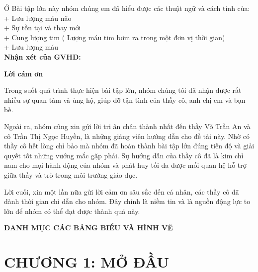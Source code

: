 \documentclass[12pt,a4paper]{article}
\begin{document}
Ở Bài tập lớn này nhóm chúng em đã hiểu được các thuật ngữ và cách tính của:\\
+ Lưu lượng máu não\\
+ Sự tồn tại và thay mới\\
+ Cung lượng tim ( Lượng máu tim bơm ra trong một đơn vị thời gian)\\
+ Lưu lượng máu \\


\textbf{Nhận xét của GVHD:}

\newpage
\begin{center}
	\large\textbf{Lời cám ơn}
\end{center}

Trong suốt quá trình thực hiện bài tập lớn, nhóm chúng tôi đã nhận 
được rất nhiều sự quan tâm và ủng hộ, giúp đỡ tận tình của thầy cô, 
anh chị em và bạn bè.

\vspace{1em}

Ngoài ra, nhóm cũng xin gửi lời tri ân chân thành nhất đến thầy 
Võ Trần An và cô Trần Thị Ngọc Huyền, là những giảng viên hướng dẫn cho đề tài 
này. Nhờ có thầy cô hết lòng chỉ bảo mà nhóm đã hoàn thành bài tập lớn đúng 
tiến độ và giải quyết tốt những vướng mắc gặp phải. Sự hướng dẫn của thầy cô đã 
là kim chỉ nam cho mọi hành động của nhóm và phát huy tối đa được mối quan hệ 
hỗ trợ giữa thầy và trò trong môi trường giáo dục.

\vspace{1em}

Lời cuối, xin một lần nữa gửi lời cảm ơn sâu sắc đến cá nhân, 
các thầy cô đã dành thời gian chỉ dẫn cho nhóm. Đây chính là niềm tin 
và là nguồn động lực to lớn để nhóm có thể đạt được thành quả này.

\newpage
\begin{center}
	\tableofcontents
\end{center}

\newpage
\begin{center}
	\Large\textbf{DANH MỤC CÁC BẢNG BIỂU VÀ HÌNH VẼ}
\end{center}
\listoftables{}
\listoffigures{}

\newpage
{}
\section*{CHƯƠNG 1: MỞ ĐẦU}

\newpage
{}
\end{document}
